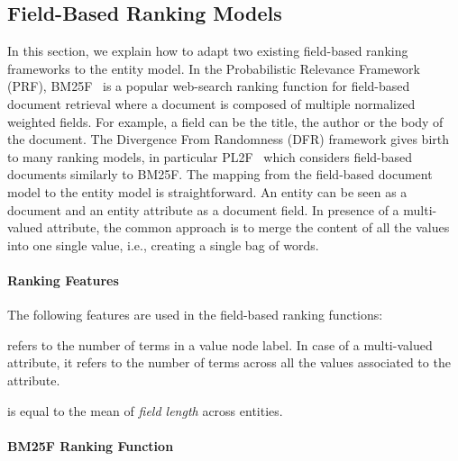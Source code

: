 \subsection{Field-Based Ranking Models}
\label{sec:ranking-wod}

In this section, we explain how to adapt two existing field-based ranking frameworks to the entity model. In the Probabilistic Relevance Framework (PRF), BM25F~\cite{zaragoza:2004:microsoft} is a popular web-search ranking function for field-based document retrieval where a document is composed of multiple normalized weighted fields. For example, a field can be the title, the author or the body of the document. The Divergence From Randomness (DFR) framework gives birth to many ranking models, in particular  PL2F~\cite{macdonald:2005:clef} which considers field-based documents similarly to BM25F. The mapping from the field-based document model to the entity model is straightforward. An entity can be seen as a document and an entity attribute as a document field. In presence of a multi-valued attribute, the common approach is to merge the content of all the values into one single value, i.e., creating a single bag of words.%

\paragraph{Ranking Features}

The following features are used in the field-based ranking functions:
\begin{description}
  \item[field length] refers to the number of terms in a value node label. In case of a multi-valued attribute, it refers to the number of terms across all the values associated to the attribute.
  \item[average field length] is equal to the mean of \emph{field length} across entities.
\end{description}

\paragraph{BM25F Ranking Function}

